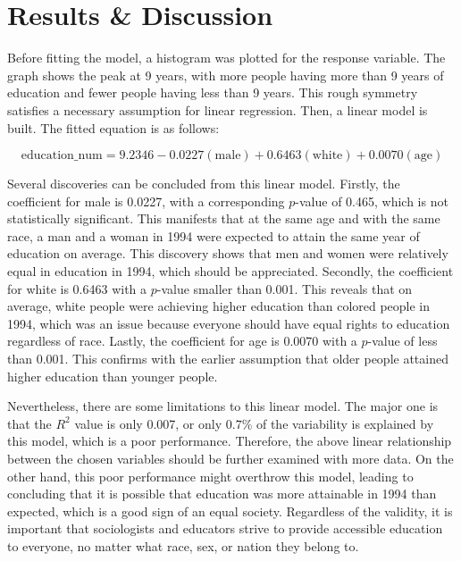 \documentclass[12pt]{report}
\begin{document}
\section*{\large Results \& Discussion}

Before fitting the model, a histogram was plotted for the response variable. The graph shows the peak at 9 years, with more people having more than 9 years of education and fewer people having less than 9 years. This rough symmetry satisfies a necessary assumption for linear regression. Then, a linear model is built. The fitted equation is as follows:

\vspace{-1.5cm}
$$\text{education\_num} = 9.2346-0.0227(\text{male})+0.6463(\text{white})+0.0070(\text{age})$$
\vspace{-1.5cm}

Several discoveries can be concluded from this linear model. Firstly, the coefficient for male is 0.0227, with a corresponding $p$-value of 0.465, which is not statistically significant. This manifests that at the same age and with the same race, a man and a woman in 1994 were expected to attain the same year of education on average. This discovery shows that men and women were relatively equal in education in 1994, which should be appreciated. Secondly, the coefficient for white is 0.6463 with a $p$-value smaller than 0.001. This reveals that on average, white people were achieving higher education than colored people in 1994, which was an issue because everyone should have equal rights to education regardless of race. Lastly, the coefficient for age is 0.0070 with a $p$-value of less than 0.001. This confirms with the earlier assumption that older people attained higher education than younger people.

Nevertheless, there are some limitations to this linear model. The major one is that the $R^2$ value is only 0.007, or only $0.7\%$ of the variability is explained by this model, which is a poor performance. Therefore, the above linear relationship between the chosen variables should be further examined with more data. On the other hand, this poor performance might overthrow this model, leading to concluding that it is possible that education was more attainable in 1994 than expected, which is a good sign of an equal society. Regardless of the validity, it is important that sociologists and educators strive to provide accessible education to everyone, no matter what race, sex, or nation they belong to.
\end{document}
